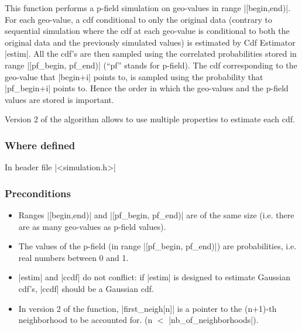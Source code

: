 \documentclass[12pt,twoside]{report}
\begin{document}
This function performs a p-field simulation on geo-values in range |[begin,end)|. For each geo-value, a cdf conditional to only the original data (contrary to sequential simulation where the cdf at each geo-value is conditional to both the original data and the previously simulated values) is estimated by Cdf Estimator |estim|. All the cdf's are then sampled using the correlated probabilities stored in range |[pf_begin, pf_end)| (``pf'' stands for p-field). 
The cdf corresponding to the geo-value that |begin+i| points to, is sampled using the probability that |pf_begin+i| points to. Hence the order in which the geo-values and the p-field values are stored is important. 

Version 2 of the algorithm allows to use multiple properties to estimate each cdf. 

\htmlrule[CLEAR=all]  \subsubsection*{Where defined}
In header file |<simulation.h>|


\htmlrule[CLEAR=all]  \subsubsection*{Preconditions}
\begin{itemize}
\item Ranges |[begin,end)| and |[pf_begin, pf_end)| are of the same size (i.e. there are as many geo-values as p-field values). 

\item The values of the p-field (in range |[pf_begin, pf_end)|) are probabilities, i.e. real numbers between 0 and 1.

\item |estim| and |ccdf| do not conflict: if |estim| is designed to estimate Gaussian cdf's, |ccdf| should be a Gaussian cdf.

\item In version 2 of the function, |first_neigh[n]| is a pointer to the (n+1)-th neighborhood to be accounted for. (n $<$ |nb_of_neighborhoods|).

\end{itemize}
\end{document}
